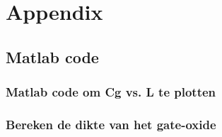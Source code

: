 \documentclass{report}
\begin{document}
\chapter{Appendix}
\section{Matlab code}
\tiny
\subsection{Matlab code om Cg vs. L te plotten}
\label{M1}


\subsection{Bereken de dikte van het gate-oxide}
\label{M2}
\end{document}
